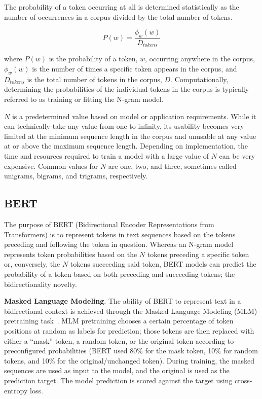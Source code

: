 \documentclass[12pt]{article}
\begin{document}
The probability of a token occurring at all is determined statistically as the number of occurrences in a corpus divided by the total number of tokens.

\begin{equation}\label{eq:ngram_prob_wj}
    P(w) = \frac{\phi_w(w)}{D_{tokens}}
\end{equation}

\noindent
where $P(w)$ is the probability of a token, $w$, occurring anywhere in the corpus, $\phi_w(w)$ is the number of times a specific token appears in the corpus, and $D_{tokens}$ is the total number of tokens in the corpus, $D$. Computationally, determining the probabilities of the individual tokens in the corpus is typically referred to as training or fitting the N-gram model.

$N$ is a predetermined value based on model or application requirements. While it can technically take any value from one to infinity, its usability becomes very limited at the minimum sequence length in the corpus and unusable at any value at or above the maximum sequence length. Depending on implementation, the time and resources required to train a model with a large value of $N$ can be very expensive. Common values for $N$ are one, two, and three, sometimes called unigrams, bigrams, and trigrams, respectively.

\subsection{BERT}\label{sec:bert}
The purpose of BERT (Bidirectional Encoder Representations from Transformers) is to represent tokens in text sequences based on the tokens preceding and following the token in question. Whereas an N-gram model represents token probabilities based on the $N$ tokens preceding a specific token or, conversely, the $N$ tokens succeeding said token, BERT models can predict the probability of a token based on both preceding and succeeding tokens; the bidirectionality novelty.

\textbf{Masked Language Modeling}. The ability of BERT to represent text in a bidirectional context is achieved through the Masked Language Modeling (MLM) pretraining task~\cite{devlin_bert_2019}. MLM pretraining chooses a certain percentage of token positions at random as labels for prediction; those tokens are then replaced with either a ``mask'' token, a random token, or the original token according to preconfigured probabilities (BERT used 80\% for the mask token, 10\% for random tokens, and 10\% for the original/unchanged token). During training, the masked sequences are used as input to the model, and the original is used as the prediction target. The model prediction is scored against the target using cross-entropy loss.
\end{document}

